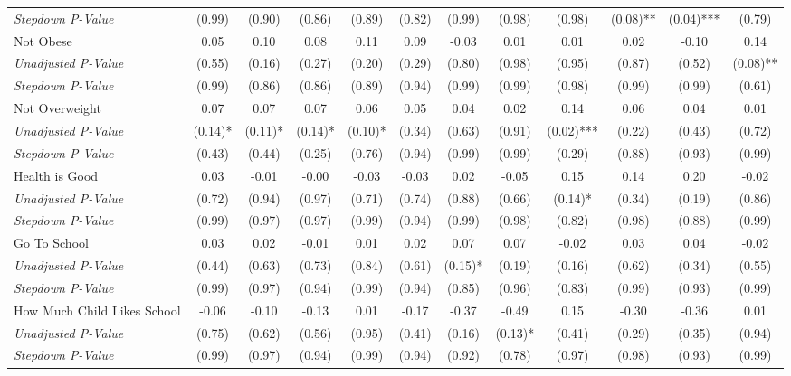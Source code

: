\begin{tabular}{l c c c c c c c c c c c}
\quad \textit{Stepdown P-Value} & (0.99) & (0.90) & (0.86) & (0.89) & (0.82) & (0.99) & (0.98) & (0.98) & (0.08)** & (0.04)*** & (0.79) \\
Not Obese & 0.05 & 0.10 & 0.08 & 0.11 & 0.09 & -0.03 & 0.01 & 0.01 & 0.02 & -0.10 & 0.14 \\
\quad \textit{Unadjusted P-Value} & (0.55) & (0.16) & (0.27) & (0.20) & (0.29) & (0.80) & (0.98) & (0.95) & (0.87) & (0.52) & (0.08)** \\
\quad \textit{Stepdown P-Value} & (0.99) & (0.86) & (0.86) & (0.89) & (0.94) & (0.99) & (0.99) & (0.98) & (0.99) & (0.99) & (0.61) \\
Not Overweight & 0.07 & 0.07 & 0.07 & 0.06 & 0.05 & 0.04 & 0.02 & 0.14 & 0.06 & 0.04 & 0.01 \\
\quad \textit{Unadjusted P-Value} & (0.14)* & (0.11)* & (0.14)* & (0.10)* & (0.34) & (0.63) & (0.91) & (0.02)*** & (0.22) & (0.43) & (0.72) \\
\quad \textit{Stepdown P-Value} & (0.43) & (0.44) & (0.25) & (0.76) & (0.94) & (0.99) & (0.99) & (0.29) & (0.88) & (0.93) & (0.99) \\
Health is Good & 0.03 & -0.01 & -0.00 & -0.03 & -0.03 & 0.02 & -0.05 & 0.15 & 0.14 & 0.20 & -0.02 \\
\quad \textit{Unadjusted P-Value} & (0.72) & (0.94) & (0.97) & (0.71) & (0.74) & (0.88) & (0.66) & (0.14)* & (0.34) & (0.19) & (0.86) \\
\quad \textit{Stepdown P-Value} & (0.99) & (0.97) & (0.97) & (0.99) & (0.94) & (0.99) & (0.98) & (0.82) & (0.98) & (0.88) & (0.99) \\
Go To School & 0.03 & 0.02 & -0.01 & 0.01 & 0.02 & 0.07 & 0.07 & -0.02 & 0.03 & 0.04 & -0.02 \\
\quad \textit{Unadjusted P-Value} & (0.44) & (0.63) & (0.73) & (0.84) & (0.61) & (0.15)* & (0.19) & (0.16) & (0.62) & (0.34) & (0.55) \\
\quad \textit{Stepdown P-Value} & (0.99) & (0.97) & (0.94) & (0.99) & (0.94) & (0.85) & (0.96) & (0.83) & (0.99) & (0.93) & (0.99) \\
How Much Child Likes School & -0.06 & -0.10 & -0.13 & 0.01 & -0.17 & -0.37 & -0.49 & 0.15 & -0.30 & -0.36 & 0.01 \\
\quad \textit{Unadjusted P-Value} & (0.75) & (0.62) & (0.56) & (0.95) & (0.41) & (0.16) & (0.13)* & (0.41) & (0.29) & (0.35) & (0.94) \\
\quad \textit{Stepdown P-Value} & (0.99) & (0.97) & (0.94) & (0.99) & (0.94) & (0.92) & (0.78) & (0.97) & (0.98) & (0.93) & (0.99) \\

\end{tabular}
